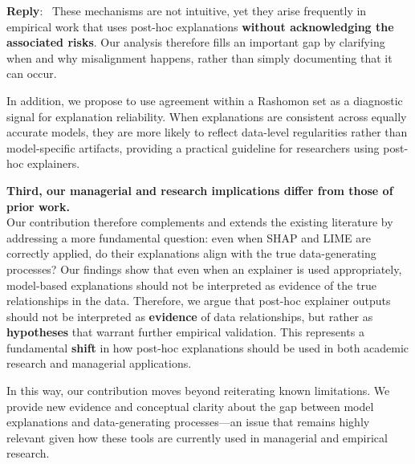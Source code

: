 \documentclass[11pt]{article}
\newcounter{se}[section]
\newenvironment{reply}
 {\par\medskip \noindent \begin{sf}\textbf{Reply}:\ }
 {\medskip \end{sf}}
\begin{document}
\begin{reply}
These mechanisms are not intuitive, yet they arise frequently in empirical work that uses post-hoc explanations \textbf{without acknowledging the associated risks}. Our analysis therefore fills an important gap by clarifying when and why misalignment happens, rather than simply documenting that it can occur.

In addition, we propose to use agreement within a Rashomon set as a diagnostic signal for explanation reliability. When explanations are consistent across equally accurate models, they are more likely to reflect data-level regularities rather than model-specific artifacts, providing a practical guideline for researchers using post-hoc explainers.

\noindent\textbf{Third, our managerial and research implications differ from those of prior work.}\medskip\\
Our contribution therefore complements and extends the existing literature by addressing a more fundamental question: even when SHAP and LIME are correctly applied, do their explanations align with the true data-generating processes?  Our findings show that even when an explainer is used appropriately, model-based explanations should not be interpreted as evidence of the true relationships in the data. Therefore, we argue that post-hoc explainer outputs should not be interpreted as \textbf{evidence} of data relationships, but rather as \textbf{hypotheses} that warrant further empirical validation. This represents a fundamental \textbf{shift} in how post-hoc explanations should be used in both academic research and managerial applications.

In this way, our contribution moves beyond reiterating known limitations. We provide new evidence and conceptual clarity about the gap between model explanations and data-generating processes—an issue that remains highly relevant given how these tools are currently used in managerial and empirical research.





\end{reply}
\end{document}
